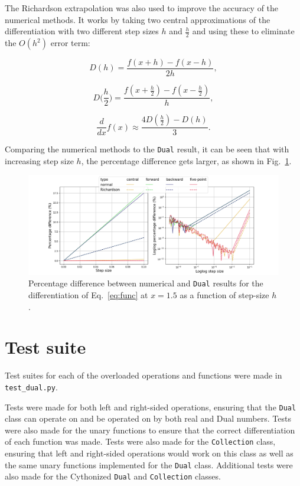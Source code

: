 \documentclass[11pt,a4paper]{article}
\begin{document}
The Richardson extrapolation \citep{1911RSPTA.210..307R} was also used to improve the accuracy of the numerical methods. It works by taking two central approximations of the differentiation with two different step sizes $h$ and $\frac{h}{2}$ and using these to eliminate the $O(h^2)$ error term:

\begin{equation}
    D(h) = \frac{f(x+h) - f(x-h)}{2h}, 
\end{equation}

\begin{equation}
    D\biggl(\frac{h}{2}\biggr) = \frac{f(x+\frac{h}{2}) - f(x-\frac{h}{2})}{h}, 
\end{equation}

\begin{equation}
    \frac{d}{dx} f(x) \approx \frac{4 D(\frac{h}{2}) - D(h)}{3}.
\end{equation}

Comparing the numerical methods to the \texttt{Dual} result, it can be seen that with increasing step size $h$, the percentage difference gets larger, as shown in Fig.~\ref{fig:pdiff}.
\begin{landscape}
\begin{figure}
    \centering
    \includegraphics[width=\columnwidth, keepaspectratio]{../percentage_difference.png}
    \caption{Percentage difference between numerical and \texttt{Dual} results for the differentiation of Eq.~\ref{eq:func} at $x=1.5$ as a function of step-size $h$.}
    \label{fig:pdiff}
\end{figure}
\end{landscape}
\clearpage
\section{Test suite}
Test suites for each of the overloaded operations and functions were made in \texttt{test\_dual.py}.

Tests were made for both left and right-sided operations, ensuring that the \texttt{Dual} class can operate on and be operated on by both real and Dual numbers. Tests were also made for the unary functions to ensure that the correct differentiation of each function was made. Tests were also made for the \texttt{Collection} class, ensuring that left and right-sided operations would work on this class as well as the same unary functions implemented for the \texttt{Dual} class. Additional tests were also made for the Cythonized \texttt{Dual} and \texttt{Collection} classes.
\end{document}
